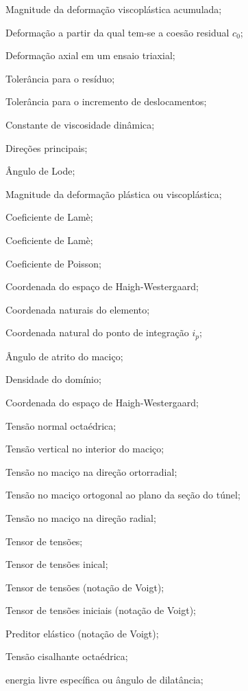 \item[$\bar{\varepsilon}^{vp}$] Magnitude da deformação viscoplástica acumulada;
\item[$ \varepsilon_I $] Deformação a partir da qual tem-se a coesão residual $c_0$;
\item[$ \varepsilon_a $] Deformação axial em um ensaio triaxial;
\item[$ \varepsilon_R $] Tolerância para o resíduo;
\item[$ \varepsilon_u $] Tolerância para o incremento de deslocamentos;

\item[$ \eta $] 		Constante de viscosidade dinâmica;
\item[$\eta_1,\eta_2,\eta_3$] 	Direções principais;
\item[$ \theta $] 		Ângulo de Lode;
\item[$\lambda$] 	Magnitude da deformação plástica ou viscoplástica;
\item[$\lambda^e$] 	Coeficiente de Lamè;
\item[$\mu^e$] 	Coeficiente de Lamè;
\item[$ \nu $] 			Coeficiente de Poisson;
\item[$ \xi_{H} $] 				Coordenada do espaço de Haigh-Westergaard;
\item[$\underline \xi$] 				Coordenada naturais do elemento;
\item[$\xil_{i_p}$] 				Coordenada natural do ponto de integração $i_p$;


\item[$ \phi $] 		Ângulo de atrito do maciço;
\item[$ \rho $] 		Densidade do domínio;
\item[$ \rho_{H} $] 		Coordenada do espaço de Haigh-Westergaard;

\item[$ \sigma_{oct} $] 	Tensão normal octaédrica;
\item[$ \sigma_{v} $] 	Tensão vertical no interior do maciço;
\item[$ \sigma_{\theta \theta} $] Tensão no maciço na direção ortorradial;
\item[$ \sigma_{zz} $] 	Tensão no maciço ortogonal ao plano da seção do túnel;
\item[$ \sigma_{rr} $] 	Tensão no maciço na direção radial;
\item[$ \sigmall $] 	Tensor de tensões;
\item[$ \sigmall_I $] 	Tensor de tensões inical;
\item[$ \sigmal $] 	Tensor de tensões (notação de Voigt);
\item[$ \sigmal_I $] 	Tensor de tensões iniciais (notação de Voigt);
\item[$ \sigmal^{trial} $] 	Preditor elástico (notação de Voigt);
\item[$ \tau_{oct} $] 	Tensão cisalhante octaédrica;
\item[$\psi$] energia livre específica ou ângulo de dilatância;

